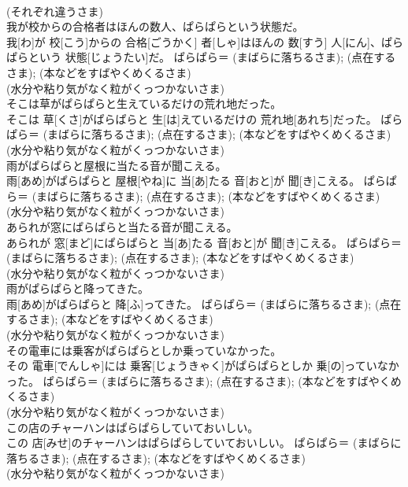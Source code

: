 \documentclass[8pt]{extreport}
\begin{document}
\begin{CJK}{UTF8}{min}
{\\	(それぞれ違うさま) 
\\	我が校からの合格者はほんの数人、ぱらぱらという状態だ。	
\\	我[わ]が 校[こう]からの 合格[ごうかく] 者[しゃ]はほんの 数[すう] 人[にん]、ぱらぱらという 状態[じょうたい]だ。	ぱらぱら＝ (まばらに落ちるさま); (点在するさま); (本などをすばやくめくるさま) 
\\	(水分や粘り気がなく粒がくっつかないさま)
\\	そこは草がぱらぱらと生えているだけの荒れ地だった。	
\\	そこは 草[くさ]がぱらぱらと 生[は]えているだけの 荒れ地[あれち]だった。	ぱらぱら＝ (まばらに落ちるさま); (点在するさま); (本などをすばやくめくるさま) 
\\	(水分や粘り気がなく粒がくっつかないさま)
\\	雨がぱらぱらと屋根に当たる音が聞こえる。	
\\	雨[あめ]がぱらぱらと 屋根[やね]に 当[あ]たる 音[おと]が 聞[き]こえる。	ぱらぱら＝ (まばらに落ちるさま); (点在するさま); (本などをすばやくめくるさま) 
\\	(水分や粘り気がなく粒がくっつかないさま)
\\	あられが窓にぱらぱらと当たる音が聞こえる。	
\\	あられが 窓[まど]にぱらぱらと 当[あ]たる 音[おと]が 聞[き]こえる。	ぱらぱら＝ (まばらに落ちるさま); (点在するさま); (本などをすばやくめくるさま) 
\\	(水分や粘り気がなく粒がくっつかないさま)
\\	雨がぱらぱらと降ってきた。	
\\	雨[あめ]がぱらぱらと 降[ふ]ってきた。	ぱらぱら＝ (まばらに落ちるさま); (点在するさま); (本などをすばやくめくるさま) 
\\	(水分や粘り気がなく粒がくっつかないさま)
\\	その電車には乗客がぱらぱらとしか乗っていなかった。	
\\	その 電車[でんしゃ]には 乗客[じょうきゃく]がぱらぱらとしか 乗[の]っていなかった。	ぱらぱら＝ (まばらに落ちるさま); (点在するさま); (本などをすばやくめくるさま) 
\\	(水分や粘り気がなく粒がくっつかないさま)
\\	この店のチャーハンはぱらぱらしていておいしい。	
\\	この 店[みせ]のチャーハンはぱらぱらしていておいしい。	ぱらぱら＝ (まばらに落ちるさま); (点在するさま); (本などをすばやくめくるさま) 
\\	(水分や粘り気がなく粒がくっつかないさま)
}
\end{CJK}
\end{document}
